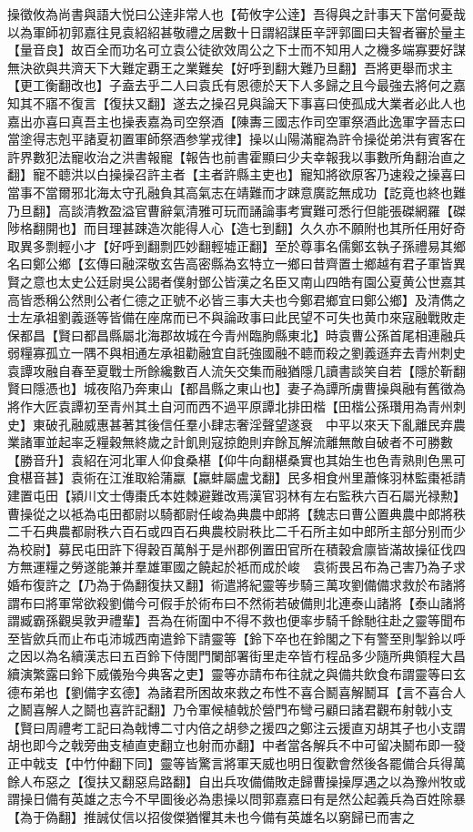 操徵攸為尚書與語大悦曰公逹非常人也【荀攸字公逹】吾得與之計事天下當何憂哉以為軍師初郭嘉往見袁紹紹甚敬禮之居數十日謂紹謀臣辛評郭圖曰夫智者審於量主【量音良】故百全而功名可立袁公徒欲效周公之下士而不知用人之機多端寡要好謀無決欲與共濟天下大難定覇王之業難矣【好呼到翻大難乃旦翻】吾將更舉而求主【更工衡翻改也】子盍去乎二人曰袁氏有恩德於天下人多歸之且今最強去將何之嘉知其不寤不復言【復扶又翻】遂去之操召見與論天下事喜曰使孤成大業者必此人也嘉出亦喜曰真吾主也操表嘉為司空祭酒【陳夀三國志作司空軍祭酒此逸軍字晉志曰當塗得志剋平諸夏初置軍師祭酒参掌戎律】操以山陽滿寵為許令操從弟洪有賓客在許界數犯法寵收治之洪書報寵【報告也前書霍顯曰少夫幸報我以事數所角翻治直之翻】寵不聼洪以白操操召許主者【主者許縣主吏也】寵知將欲原客乃速殺之操喜曰當事不當爾邪北海太守孔融負其高氣志在靖難而才踈意廣訖無成功【訖竟也終也難乃旦翻】高談清教盈溢官曹辭氣清雅可玩而誦論事考實難可悉行但能張磔網羅【磔陟格翻開也】而目理甚踈造次能得人心【造七到翻】久久亦不願附也其所任用好奇取異多剽輕小才【好呼到翻剽匹妙翻輕墟正翻】至於尊事名儒鄭玄執子孫禮易其鄉名曰鄭公鄉【玄傳曰融深敬玄告高密縣為玄特立一鄉曰昔齊置士鄉越有君子軍皆異賢之意也太史公廷尉吳公謁者僕射鄧公皆漢之名臣又南山四皓有園公夏黄公世嘉其高皆悉稱公然則公者仁德之正號不必皆三事大夫也今鄭君鄉宜曰鄭公鄉】及清儁之士左承祖劉義遜等皆備在座席而已不與論政事曰此民望不可失也黄巾來寇融戰敗走保都昌【賢曰都昌縣屬北海郡故城在今青州臨朐縣東北】時袁曹公孫首尾相連融兵弱糧寡孤立一隅不與相通左承祖勸融宜自託強國融不聼而殺之劉義遜弃去青州刺史袁譚攻融自春至夏戰士所餘纔數百人流矢交集而融猶隱几讀書談笑自若【隱於靳翻賢曰隱憑也】城夜陷乃奔東山【都昌縣之東山也】妻子為譚所虜曹操與融有舊徵為將作大匠袁譚初至青州其土自河而西不過平原譚北排田楷【田楷公孫瓚用為青州刺史】東破孔融威惠甚著其後信任羣小肆志奢淫聲望遂衰　中平以來天下亂離民弃農業諸軍並起率乏糧穀無終歲之計飢則寇掠飽則弃餘瓦解流離無敵自破者不可勝數【勝音升】袁紹在河北軍人仰食桑椹【仰牛向翻椹桑實也其始生也色青熟則色黑可食椹音甚】袁術在江淮取給蒲蠃【蠃蚌屬盧戈翻】民多相食州里蕭條羽林監棗袛請建置屯田【潁川文士傳棗氏本姓棘避難改焉漢官羽林有左右監秩六百石屬光禄勲】曹操從之以袛為屯田都尉以騎都尉任峻為典農中郎將【魏志曰曹公置典農中郎將秩二千石典農都尉秩六百石或四百石典農校尉秩比二千石所主如中郎所主部分别而少為校尉】募民屯田許下得穀百萬斛于是州郡例置田官所在積穀倉廪皆滿故操征伐四方無運糧之勞遂能兼并羣雄軍國之饒起於袛而成於峻　袁術畏呂布為己害乃為子求婚布復許之【乃為于偽翻復扶又翻】術遣將紀靈等步騎三萬攻劉備備求救於布諸將謂布曰將軍常欲殺劉備今可假手於術布曰不然術若破備則北連泰山諸將【泰山諸將謂臧霸孫觀吳敦尹禮輩】吾為在術圍中不得不救也便率步騎千餘馳往赴之靈等聞布至皆歛兵而止布屯沛城西南遣鈴下請靈等【鈴下卒也在鈴閣之下有警至則掣鈴以呼之因以為名續漢志曰五百鈴下侍閭門闌部署街里走卒皆冇程品多少隨所典領程大昌續演繁露曰鈴下威儀殆今典客之吏】靈等亦請布布往就之與備共飲食布謂靈等曰玄德布弟也【劉備字玄德】為諸君所困故來救之布性不喜合鬭喜解鬭耳【言不喜合人之鬭喜解人之鬬也喜許記翻】乃令軍候植戟於營門布彎弓顧曰諸君觀布射戟小支【賢曰周禮考工記曰為戟博二寸内倍之胡參之援四之鄭注云援直刃胡其孑也小支謂胡也即今之戟旁曲支植直吏翻立也射而亦翻】中者當各解兵不中可留决鬭布即一發正中戟支【中竹仲翻下同】靈等皆驚言將軍天威也明日復歡會然後各罷備合兵得萬餘人布惡之【復扶又翻惡烏路翻】自出兵攻備備敗走歸曹操操厚遇之以為豫州牧或謂操日備有英雄之志今不早圖後必為患操以問郭嘉嘉曰有是然公起義兵為百姓除暴【為于偽翻】推誠仗信以招俊傑猶懼其未也今備有英雄名以窮歸已而害之